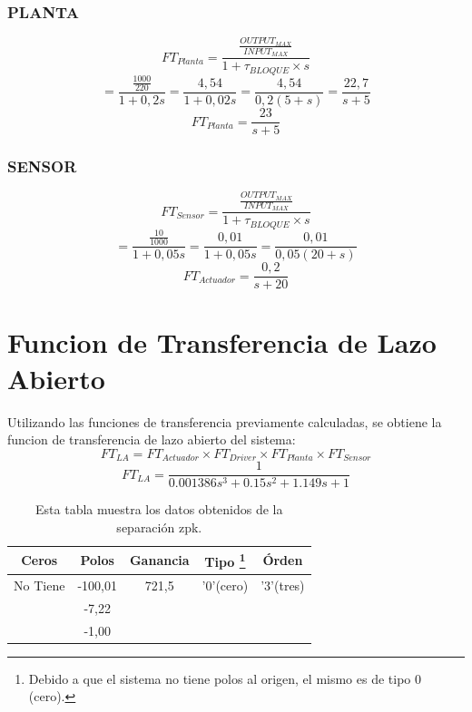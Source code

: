 \documentclass[a4paper,11pt]{article}
\begin{document}
\subsubsection{PLANTA}
$$FT_{Planta} =\frac{\frac{OUTPUT_{MAX}}{INPUT_{MAX}}}{1+\tau_{BLOQUE}\times s}$$
$$=\frac{\frac{1000}{220}}{1+0,2 s}=\frac{4,54}{1+0,02 s}=\frac{4,54}{0,2(5+s)}= \frac{22,7}{s+5}$$
$$FT_{Planta} = \frac{23}{s+5}$$

\subsubsection{SENSOR}
$$FT_{Sensor} =\frac{\frac{OUTPUT_{MAX}}{INPUT_{MAX}}}{1+\tau_{BLOQUE}\times s}$$
$$=\frac{\frac{10}{1000}}{1+0,05 s}=\frac{0,01}{1+0,05 s}=\frac{0,01}{0,05(20+s)}$$
$$FT_{Actuador} = \frac{0,2}{s+20}$$

\section{Funcion de Transferencia de Lazo Abierto}
Utilizando las funciones de transferencia previamente calculadas, se obtiene la funcion de transferencia de lazo abierto del sistema:
$$FT_{LA}=FT_{Actuador} \times FT_{Driver} \times FT_{Planta} \times FT_{Sensor} $$
$$FT_{LA}=\frac{1}{0.001386s^3 + 0.15 s^2 + 1.149 s + 1}$$
\begin{table}[h!]
\centering
\caption{Esta tabla muestra los datos obtenidos de la separación zpk.}
\begin{tabular}{|ccccc|}
\hline 
Ceros & Polos & Ganancia & Tipo \footnote{Debido a que el sistema no tiene polos al origen, el mismo es de tipo 0 (cero).} & Órden \tabularnewline
\hline 
\hline 
 No Tiene & -100,01 & 721,5 & '0'(cero) & '3'(tres) \tabularnewline
 & -7,22 & & &\tabularnewline
 & -1,00 & & &\tabularnewline
\hline 
\end{tabular}
\end{table}
\end{document}
